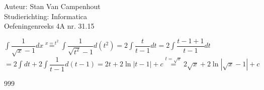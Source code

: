\documentclass[a4paper]{article}
\begin{document}
  
\noindent \large Auteur: Stan Van Campenhout \\
\noindent \large Studierichting:  Informatica\\
\noindent \large Oefeningenreeks 4A nr. 31.15\\

\medskip

\normalsize

$ \displaystyle\int \dfrac{1}{\sqrt{x}-1} dx \stackrel{x = t^2}{=} \displaystyle\int \dfrac{1}{\sqrt{t^2}-1} d\left(t^2\right) 
= 2\displaystyle\int \dfrac{t}{t - 1}dt =  2\displaystyle\int \dfrac{t - 1 + 1}{t - 1}dt$\\

$ = 2\displaystyle\int dt + 2\displaystyle\int\dfrac{1}{t - 1}d\left(t - 1\right) 
= 2t + 2\ln|t - 1| + c  \stackrel{t = \sqrt{x}}{=} 2\sqrt{x} + 2\ln|\sqrt{x} - 1| + c $\\

\begin{thebibliography}{999}
\end{thebibliography}
\end{document}
